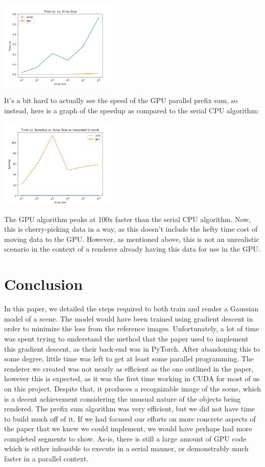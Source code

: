 \documentclass[12pt, a4paper, twocolumn]{article}
\begin{document}
\includegraphics[width = 0.425\textwidth]{time vs arr_size-serial-gpu.png}

It's a bit hard to actually see the speed of the GPU parallel prefix sum, so instead, here is a graph of the speedup as compared to the serial CPU algorithm:

\includegraphics[width = 0.425\textwidth]{Speeduptime vs arr_size-serial-gpu.png}

The GPU algorithm peaks at 100x faster than the serial CPU algorithm. Now, this is cherry-picking data in a way, as this doesn't include the hefty time cost of moving data to the GPU. However, as mentioned above, this is not an unrealistic scenario in the context of a renderer already having this data for use in the GPU.

\section{Conclusion}
In this paper, we detailed the steps required to both train and render a Gaussian model of a scene. The model would have been trained using gradient descent in order to minimize the loss from the reference images. Unfortunately, a lot of time was spent trying to understand the method that the paper used to implement this gradient descent, as their back-end was in PyTorch. After abandoning this to some degree, little time was left to get at least some parallel programming. The renderer we created was not nearly as efficient as the one outlined in the paper, however this is expected, as it was the first time working in CUDA for most of us on this project. Despite that, it produces a recognizable image of the scene, which is a decent achievement considering the unusual nature of the objects being rendered. The prefix sum algorithm was very efficient, but we did not have time to build much off of it. If we had focused our efforts on more concrete aspects of the paper that we knew we could implement, we would have perhaps had more completed segments to show. As-is, there is still a large amount of GPU code which is either infeasible to execute in a serial manner, or demonstrably much faster in a parallel context.
\end{document}
